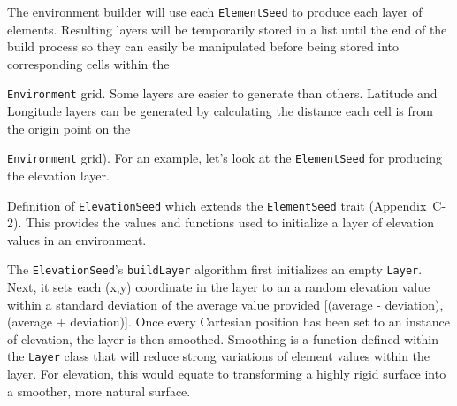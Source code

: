 The environment builder will use each \texttt{ElementSeed} to produce each layer of elements.
Resulting layers will be temporarily stored in a list until the end of the build process so they can easily be manipulated before being stored into corresponding cells within the

\noindent
\texttt{Environment} grid.
Some layers are easier to generate than others.
Latitude and Longitude layers can be generated by calculating the distance each cell is from the origin point on the

\noindent
\texttt{Environment} grid).
For an example, let’s look at the \texttt{ElementSeed} for producing the elevation layer.

\begin{lstfloat}
  \caption[ElevationSeed Class]{Definition of \texttt{ElevationSeed} which extends the \texttt{ElementSeed} trait (Appendix~C-2). This provides the values and functions used to initialize a layer of elevation values in an environment.}
  
  \label{code:elevation_seed}
\end{lstfloat}


The \texttt{ElevationSeed}’s \texttt{buildLayer} algorithm first initializes an empty \texttt{Layer}.
Next, it sets each (x,y) coordinate in the layer to an a random elevation value within a standard deviation of the average value provided [(average - deviation), (average + deviation)].
Once every Cartesian position has been set to an instance of elevation, the layer is then smoothed.
Smoothing is a function defined within the \texttt{Layer} class that will reduce strong variations of element values within the layer.
For elevation, this would equate to transforming a highly rigid surface into a smoother, more natural surface.




